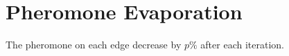 \section{Pheromone Evaporation}

The pheromone on each edge decrease by $p\%$ after each iteration. 